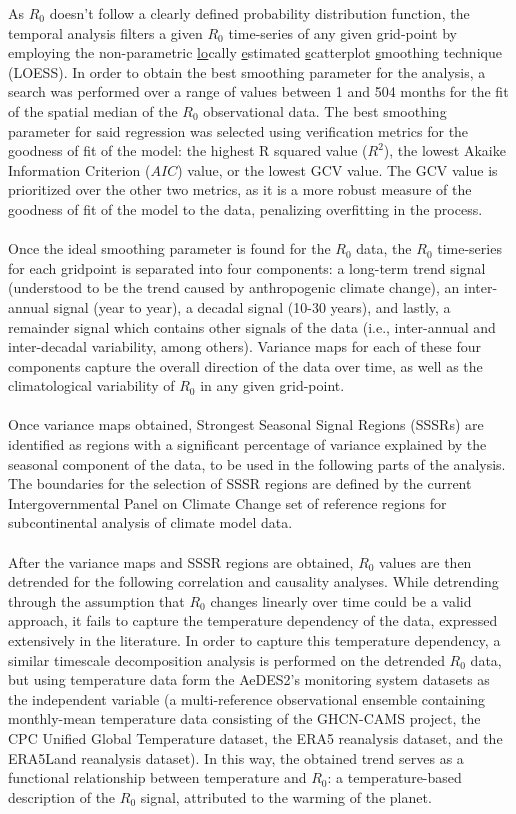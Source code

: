\documentclass[article,10pt,twocolumn]{wlscirep}
\begin{document}
  As $R_0$ doesn't follow a clearly defined probability distribution function, the temporal analysis filters a given $R_0$ time-series of any given grid-point by employing the non-parametric \underline{lo}cally \underline{e}stimated \underline{s}catterplot \underline{s}moothing technique (LOESS). In order to obtain the best smoothing parameter for the analysis, a search was performed over a range of values between 1 and 504 months for the fit of the spatial median of the $R_0$ observational data. The best smoothing parameter for said regression was selected using verification metrics for the goodness of fit of the model: the highest R squared value ($R^2$), the lowest Akaike Information Criterion ($AIC$) value, or the lowest GCV value. The GCV value is prioritized over the other two metrics, as it is a more robust measure of the goodness of fit of the model to the data, penalizing overfitting in the process.
  \\
  \\
  Once the ideal smoothing parameter is found for the $R_0$ data, the $R_0$ time-series for each gridpoint is separated into four components: a long-term trend signal (understood to be the trend caused by anthropogenic climate change), an inter-annual signal (year to year), a decadal signal (10-30 years), and lastly, a remainder signal which contains other signals of the data (i.e., inter-annual and inter-decadal variability, among others). Variance maps for each of these four components capture the overall direction of the data over time, as well as the climatological variability of $R_0$ in any given grid-point. 
  \\
  \\
  Once variance maps obtained, Strongest Seasonal Signal Regions (SSSRs) are identified as regions with a significant percentage of variance explained by the seasonal component of the data, to be used in the following parts of the analysis. The boundaries for the selection of SSSR regions are defined by the current Intergovernmental Panel on Climate Change set of reference regions for subcontinental analysis of climate model data.
  \\
  \\
  After the variance maps and SSSR regions are obtained, $R_0$ values are then detrended for the following correlation and causality analyses. While detrending through the assumption that $R_0$ changes linearly over time could be a valid approach, it fails to capture the temperature dependency of the data, expressed extensively in the literature. In order to capture this temperature dependency, a similar timescale decomposition analysis is performed on the detrended $R_0$ data, but using temperature data form the AeDES2's monitoring system datasets as the independent variable (a multi-reference observational ensemble containing monthly-mean temperature data consisting of the GHCN-CAMS project, the CPC Unified Global Temperature dataset, the ERA5 reanalysis dataset, and the ERA5Land reanalysis dataset). In this way, the obtained trend serves as a functional relationship between temperature and $R_0$: a temperature-based description of the $R_0$ signal, attributed to the warming of the planet.
  
\end{document}
